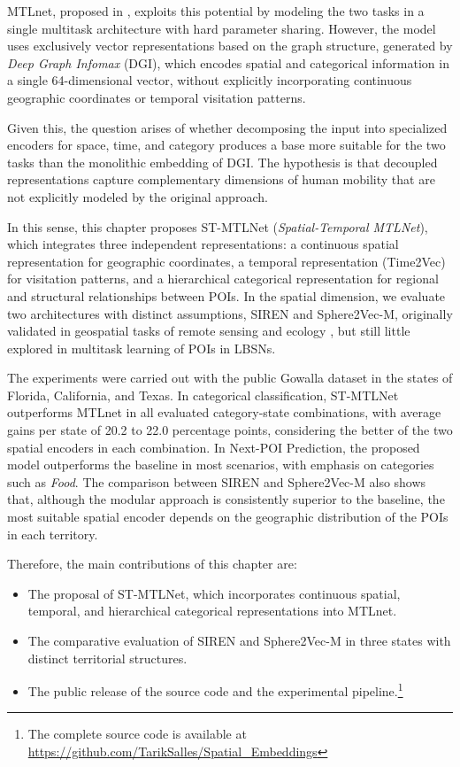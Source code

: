 MTLnet, proposed in \cite{silva2025mtlnet}, exploits this potential by modeling the two tasks in a single multitask architecture with hard parameter sharing. However, the model uses exclusively vector representations based on the graph structure, generated by \textit{Deep Graph Infomax} (DGI), which encodes spatial and categorical information in a single 64-dimensional vector, without explicitly incorporating continuous geographic coordinates or temporal visitation patterns.

Given this, the question arises of whether decomposing the input into specialized encoders for space, time, and category produces a base more suitable for the two tasks than the monolithic embedding of DGI. The hypothesis is that decoupled representations capture complementary dimensions of human mobility that are not explicitly modeled by the original approach.

In this sense, this chapter proposes ST-MTLNet (\textit{Spatial-Temporal MTLNet}), which integrates three independent representations: a continuous spatial representation for geographic coordinates, a temporal representation (Time2Vec) for visitation patterns, and a hierarchical categorical representation for regional and structural relationships between POIs. In the spatial dimension, we evaluate two architectures with distinct assumptions, SIREN and Sphere2Vec-M, originally validated in geospatial tasks of remote sensing and ecology \cite{wu2024torchspatial}, but still little explored in multitask learning of POIs in LBSNs.

The experiments were carried out with the public Gowalla dataset \cite{jure2014snap} in the states of Florida, California, and Texas. In categorical classification, ST-MTLNet outperforms MTLnet in all evaluated category-state combinations, with average gains per state of 20.2 to 22.0 percentage points, considering the better of the two spatial encoders in each combination. In Next-POI Prediction, the proposed model outperforms the baseline in most scenarios, with emphasis on categories such as \textit{Food}. The comparison between SIREN and Sphere2Vec-M also shows that, although the modular approach is consistently superior to the baseline, the most suitable spatial encoder depends on the geographic distribution of the POIs in each territory.

Therefore, the main contributions of this chapter are:
\begin{itemize}
\item The proposal of ST-MTLNet, which incorporates continuous spatial, temporal, and hierarchical categorical representations into MTLnet.

\item The comparative evaluation of SIREN and Sphere2Vec-M in three states with distinct territorial structures.

\item The public release of the source code and the experimental pipeline.\footnote{The complete source code is available at \url{https://github.com/TarikSalles/Spatial_Embeddings}}
\end{itemize}

